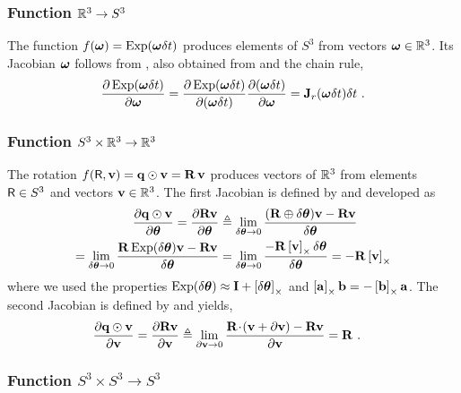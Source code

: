 \subsubsection{Function $\bbR^3\to S^3$} 
\label{sec:jac_R3toSO3}

The function $f(\bw) = \Exp(\bw\dt)$ produces elements of $S^3$ from vectors $\bw\in\bbR^3$. 
Its Jacobian \wrt $\bw$ follows from , also obtained from  and the chain rule,
%
\begin{align*}
\dpar{\Exp(\bw\dt)}{\bw}
= \dpar{\Exp(\bw\dt)}{(\bw\dt)}\dpar{(\bw\dt)}{\bw} 
= \bfJ_r(\bw\dt)\dt
~.
\end{align*}
%


\subsubsection{Function $S^3\times\bbR^3\to\bbR^3$} 
\label{sec:jac_SO3xR3toR3}

The rotation $f(\sR,\bfv) = \bfq\od\bfv = \bfR\,\bfv$ produces vectors of $\bbR^3$ from elements $\sR\in S^3$ and vectors $\bfv\in\bbR^3$. The first Jacobian is defined by  and developed as
%
\begin{align*}
\dpar{\bfq\od\bfv}{\bth} = \dpar{\bfR\bfv}{\bth} 
&\te \lim_{\delta\bth\to0}\frac{(\bfR\oplus\delta\bth)\bfv-\bfR\bfv}{\delta\bth} \\
= \lim_{\delta\bth\to0}\frac{\bfR\Exp(\delta\bth)\bfv-\bfR\bfv}{\delta\bth} 
&= \lim_{\delta\bth\to0}\frac{-\bfR\hatx{\bfv}\delta\bth}{\delta\bth} 
= -\bfR\hatx{\bfv} 
\end{align*}
%
where we used the properties $\Exp(\dth) \approx \bfI + \hatx{\dth}$ and  $\hatx{\bfa}\bfb = -\hatx{\bfb}\bfa$. 
The second Jacobian is defined by  and yields,
%
\begin{align*}
\dpar{\bfq\od\bfv}{\bfv} = \dpar{\bfR\bfv}{\bfv} 
&\te \lim_{\partial\bfv\to0}\frac{\bfR\tdot(\bfv+\partial\bfv)-\bfR\bfv}{\partial\bfv} 
= \bfR
~.
\end{align*}

\subsubsection{Function $S^3\times S^3\to S^3$}
\label{sec:jac_SO3xSO3toSO3}

